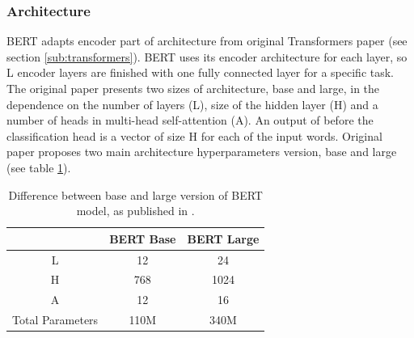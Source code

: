 \subsubsection{Architecture}
BERT adapts encoder part of architecture from original Transformers paper   \citep{Vaswani2017} (see section \ref{sub:transformers}).
BERT uses its encoder architecture for each layer, so L encoder layers are finished with one fully connected layer for a specific task. The original paper presents two sizes of architecture, base and large, in the dependence on the number of layers (L), size of the hidden layer (H) and a number of heads in multi-head self-attention (A). An output of before the classification head is a vector of size H for each of the input words. Original paper proposes two main architecture hyperparameters version, base and large (see table \ref{Tab:base_large}).
\begin{table}
\centering

\begin{tabular}{ |c|c|c| } 
 \hline
    & BERT Base &BERT Large \\ 
 \hline \hline
 L & 12 & 24 \\ \hline
 H & 768 & 1024 \\ \hline
  A & 12 & 16\\ \hline
Total Parameters & 110M & 340M \\\hline
\end{tabular}
\caption{Difference between base and large version of BERT model, as published in 
\citep{Devlin2019}.
} 
\label{Tab:base_large}
\end{table}

